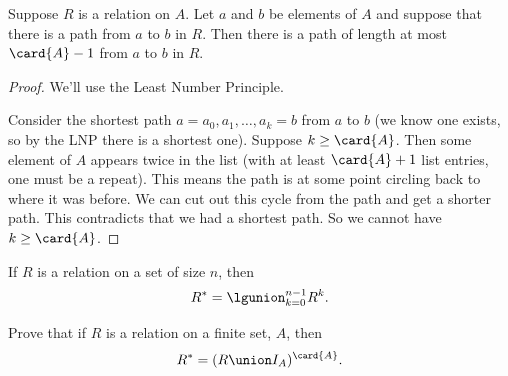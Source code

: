 \begin{lemma}
Suppose $R$ is a relation on $A$.  Let $a$ and $b$ be elements of $A$ and
suppose that there is a path from $a$ to $b$ in $R$.  Then there is a path
of length at most $\card{A}-1$ from $a$ to $b$ in $R$.
\end{lemma}

\begin{proof}
We'll use the Least Number Principle.

Consider the shortest path $a=a_0,a_1,\dots,a_k=b$ from $a$ to $b$ (we
know one exists, so by the LNP there is a shortest one).  Suppose $k \ge
\card{A}$.  Then some element of $A$ appears twice in the list (with at
least $\card{A}+1$ list entries, one must be a repeat).  This means the
path is at some point circling back to where it was before.  We can cut
out this cycle from the path and get a shorter path.  This contradicts
that we had a shortest path.  So we cannot have $k \ge \card{A}$.
\end{proof}

\begin{corollary}
If $R$ is a relation on a set of size $n$, then
\[
R^* = \lgunion_{k=0}^{n-1} R^k.
\]
\end{corollary}

\begin{problem}
Prove that if $R$ is a relation on a finite set, $A$, then
\[
R^* = (R \union I_A)^{\card{A}}.
\]
\end{problem}

